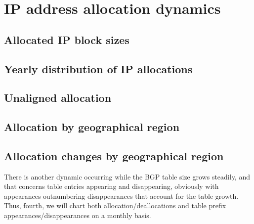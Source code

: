 \section{IP address allocation dynamics}
\label{sec:allocations}


\subsection{Allocated IP block sizes}

\subsection{Yearly distribution of IP allocations}

\subsection{Unaligned allocation}

\subsection{Allocation by geographical region}

\subsection{Allocation changes by geographical region}

There is another dynamic occurring while the BGP table size grows steadily, and that concerns table entries appearing and disappearing, obviously with appearances outnumbering disappearances that account for the table growth.  Thus, fourth, we will chart both allocation/deallocations and table prefix appearances/disappearances on a monthly basis.

